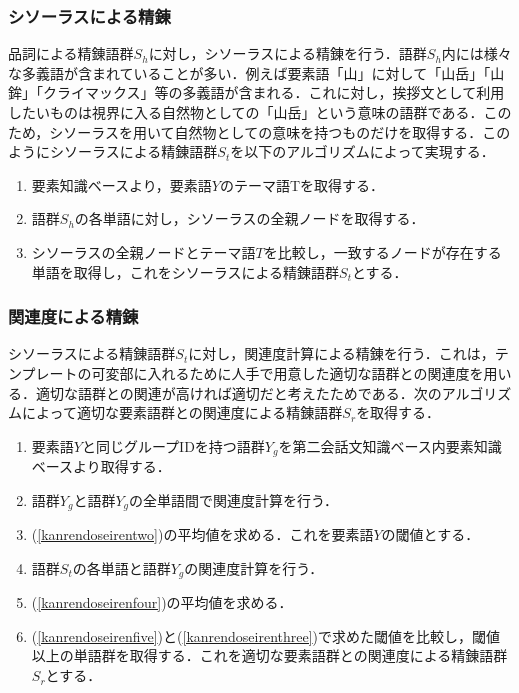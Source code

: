\subsubsection{シソーラスによる精錬}
品詞による精錬語群$S_h$に対し，シソーラス\cite{NttThesaurus1997}による精錬を行う．語群$S_h$内には様々な多義語が含まれていることが多い．例えば要素語「山」に対して「山岳」「山鉾」「クライマックス」等の多義語が含まれる．これに対し，挨拶文として利用したいものは視界に入る自然物としての「山岳」という意味の語群である．このため，シソーラスを用いて自然物としての意味を持つものだけを取得する．このようにシソーラスによる精錬語群$S_t$を以下のアルゴリズムによって実現する．
\begin{enumerate}
	\item 要素知識ベースより，要素語$Y$のテーマ語Tを取得する．
	\item 語群$S_h$の各単語に対し，シソーラスの全親ノードを取得する．
	\item シソーラスの全親ノードとテーマ語$T$を比較し，一致するノードが存在する単語を取得し，これをシソーラスによる精錬語群$S_t$とする．
\end{enumerate}
\subsubsection{関連度による精錬} \label{kanrendoseiren}
シソーラスによる精錬語群$S_t$に対し，関連度計算による精錬を行う．これは，テンプレートの可変部に入れるために人手で用意した適切な語群との関連度を用いる．適切な語群との関連が高ければ適切だと考えたためである．次のアルゴリズムによって適切な要素語群との関連度による精錬語群$S_r$を取得する．
\begin{enumerate}
	\item 要素語$Y$と同じグループIDを持つ語群$Y_g$を第二会話文知識ベース内要素知識ベースより取得する．
	\item \label{kanrendoseirentwo}語群$Y_g$と語群$Y_g$の全単語間で関連度計算を行う．
	\item \label{kanrendoseirenthree}(\ref{kanrendoseirentwo})の平均値を求める．これを要素語$Y$の閾値とする．
	\item \label{kanrendoseirenfour}語群$S_t$の各単語と語群$Y_g$の関連度計算を行う．
	\item \label{kanrendoseirenfive}(\ref{kanrendoseirenfour})の平均値を求める．
	\item (\ref{kanrendoseirenfive})と(\ref{kanrendoseirenthree})で求めた閾値を比較し，閾値以上の単語群を取得する．これを適切な要素語群との関連度による精錬語群$S_r$とする．
\end{enumerate}
